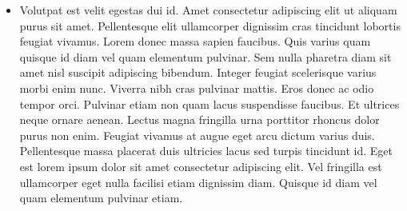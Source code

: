 \documentclass[article]{seminar}
\newcommand{\sltitle}[1]{{\centering\textbf{\Large #1}
    \vskip 2em plus 0pt minus 2em\par}} %
\begin{document}



\label{BAR}

\begin{itemize}
\item Volutpat est velit egestas dui id. Amet consectetur adipiscing elit ut
aliquam purus sit amet. Pellentesque elit ullamcorper dignissim cras tincidunt
lobortis feugiat vivamus. Lorem donec massa sapien faucibus. Quis varius quam
quisque id diam vel quam elementum pulvinar. Sem nulla pharetra diam sit amet
nisl suscipit adipiscing bibendum. Integer feugiat scelerisque varius morbi enim
nunc. Viverra nibh cras pulvinar mattis. Eros donec ac odio tempor orci.
Pulvinar etiam non quam lacus suspendisse faucibus. Et ultrices neque ornare
aenean. Lectus magna fringilla urna porttitor rhoncus dolor purus non enim.
Feugiat vivamus at augue eget arcu dictum varius duis. Pellentesque massa
placerat duis ultricies lacus sed turpis tincidunt id. Eget est lorem ipsum
dolor sit amet consectetur adipiscing elit. Vel fringilla est ullamcorper eget
nulla facilisi etiam dignissim diam. Quisque id diam vel quam elementum pulvinar
etiam.
\end{itemize}
\end{document}
